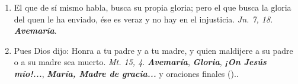 \documentclass[./rosary.tex]{subfiles}
\begin{document}
\begin{enumerate}
      \item El que de sí mismo habla, busca su propia gloria; pero el que busca la gloria del quen le ha enviado, ése es veraz y no hay en el injusticia.
            \emph{Jn. 7, 18}. \textbf{\emph{Avemaría}}.

      \item Pues Dios dijo: Honra a tu padre y a tu madre, y quien maldijere a su padre o a su madre sea muerto.
            \emph{Mt. 15, 4}. \textbf{\emph{Avemaría}}, \textbf{\emph{Gloria}}, \textbf{\emph{¡On Jesús mío!...}}, \textbf{\emph{María, Madre de gracia...}} y
            oraciones finales ()..
\end{enumerate}
\end{document}
